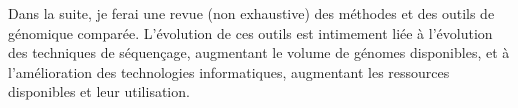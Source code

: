 Dans la suite, je ferai une revue (non exhaustive) des méthodes et des outils de génomique comparée. L'évolution de ces outils est intimement liée à l'évolution des techniques de séquençage, augmentant le volume de génomes disponibles, et à l'amélioration des technologies informatiques, augmentant les ressources disponibles et leur utilisation. 












